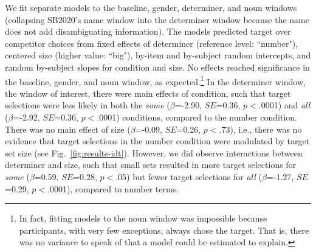 \documentclass[10pt,letterpaper]{article}
\newcommand{\figref}[1]{Fig.~\ref{#1}}
\begin{document}
We fit separate models to the baseline, gender, determiner, and noun windows (collapsing SB2020's name window into the determiner window because the name does not add disambiguating information). The models predicted target over competitor choices from fixed effects of determiner (reference level: ``number"), centered size (higher value: ``big"), by-item and by-subject random intercepts, and random by-subject slopes for condition and size. No effects reached significance in the baseline, gender, and noun window, as expected.\footnote{In fact, fitting models to the noun window was impossible because participants, with very few exceptions, always chose the target. That is, there was no variance to speak of that a model could be estimated to explain.}  In the determiner window, the window of interest, there were main effects of condition, such that target selections were less likely in both the \emph{some} ($\beta$=-2.90, $SE$=0.36, $p<$.0001) and \emph{all} ($\beta$=-2.92, $SE$=0.36, $p<$.0001) conditions, compared to the number condition. There was no main effect of size ($\beta$=-0.09, $SE$=0.26, $p<$.73), i.e., there was no evidence that target selections in the number condition were modulated by  target set size (see \figref{fig:results-idt}). However, we did observe interactions between determiner and size, such that small sets resulted in more target selections for \emph{some} ($\beta$=0.59, $SE$=0.28, $p<$.05) but fewer target selections for \emph{all} ($\beta$=-1.27, $SE$=0.29, $p<$.0001), compared to number terms. 

\end{document}
